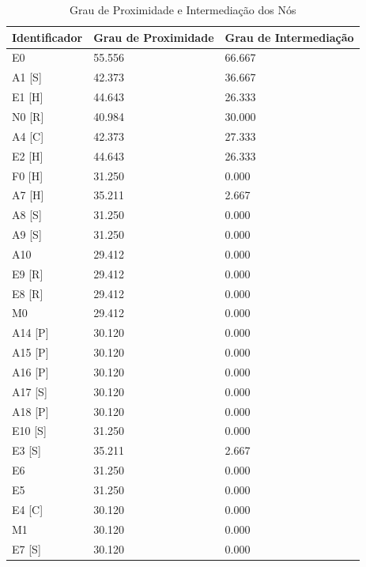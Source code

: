 \begin{table}[]
\centering
\caption{Grau de Proximidade e Intermediação dos Nós}
\label{closeness-betweeness-degree}
\begin{tabular}{|l|l|l|}
\hline
Identificador & Grau de Proximidade & Grau de Intermediação \\ \hline
E0            & 55.556              & 66.667                \\ \hline
A1 {[}S{]}    & 42.373              & 36.667                \\ \hline
E1 {[}H{]}    & 44.643              & 26.333                \\ \hline
N0 {[}R{]}    & 40.984              & 30.000                \\ \hline
A4 {[}C{]}    & 42.373              & 27.333                \\ \hline
E2 {[}H{]}    & 44.643              & 26.333                \\ \hline
F0 {[}H{]}    & 31.250              & 0.000                 \\ \hline
A7 {[}H{]}    & 35.211              & 2.667                 \\ \hline
A8 {[}S{]}    & 31.250              & 0.000                 \\ \hline
A9 {[}S{]}    & 31.250              & 0.000                 \\ \hline
A10           & 29.412              & 0.000                 \\ \hline
E9 {[}R{]}    & 29.412              & 0.000                 \\ \hline
E8 {[}R{]}    & 29.412              & 0.000                 \\ \hline
M0            & 29.412              & 0.000                 \\ \hline
A14 {[}P{]}   & 30.120              & 0.000                 \\ \hline
A15 {[}P{]}   & 30.120              & 0.000                 \\ \hline
A16 {[}P{]}   & 30.120              & 0.000                 \\ \hline
A17 {[}S{]}   & 30.120              & 0.000                 \\ \hline
A18 {[}P{]}   & 30.120              & 0.000                 \\ \hline
E10 {[}S{]}   & 31.250              & 0.000                 \\ \hline
E3 {[}S{]}    & 35.211              & 2.667                 \\ \hline
E6            & 31.250              & 0.000                 \\ \hline
E5            & 31.250              & 0.000                 \\ \hline
E4 {[}C{]}    & 30.120              & 0.000                 \\ \hline
M1            & 30.120              & 0.000                 \\ \hline
E7 {[}S{]}    & 30.120              & 0.000                 \\ \hline
\end{tabular}
\end{table}

